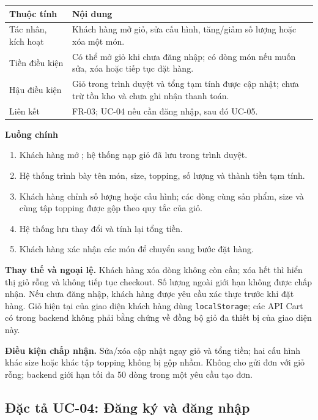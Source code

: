 \begin{longtable}{|p{3.1cm}|p{11.5cm}|}
\hline \textbf{Thuộc tính} & \textbf{Nội dung} \\ \hline
Tác nhân, kích hoạt & Khách hàng mở giỏ, sửa cấu hình, tăng/giảm số lượng
hoặc xóa một món. \\ \hline
Tiền điều kiện & Có thể mở giỏ khi chưa đăng nhập; có dòng món nếu muốn
sửa, xóa hoặc tiếp tục đặt hàng. \\ \hline
Hậu điều kiện & Giỏ trong trình duyệt và tổng tạm tính được cập nhật;
chưa trừ tồn kho và chưa ghi nhận thanh toán. \\ \hline
Liên kết & FR-03; UC-04 nếu cần đăng nhập, sau đó UC-05. \\ \hline
\end{longtable}

\textbf{Luồng chính}
\begin{enumerate}[nosep]
  \item Khách hàng mở ; hệ thống nạp giỏ đã lưu trong trình duyệt.
  \item Hệ thống trình bày tên món, size, topping, số lượng và thành tiền tạm tính.
  \item Khách hàng chỉnh số lượng hoặc cấu hình; các dòng cùng sản phẩm,
  size và cùng tập topping được gộp theo quy tắc của giỏ.
  \item Hệ thống lưu thay đổi và tính lại tổng tiền.
  \item Khách hàng xác nhận các món để chuyển sang bước đặt hàng.
\end{enumerate}

\textbf{Thay thế và ngoại lệ.} Khách hàng xóa dòng không còn cần; xóa hết
thì hiển thị giỏ rỗng và không tiếp tục checkout. Số lượng ngoài giới hạn
không được chấp nhận. Nếu chưa đăng nhập, khách hàng được yêu cầu xác
thực trước khi đặt hàng. Giỏ hiện tại của giao diện khách hàng dùng
\texttt{localStorage}; các API Cart có trong backend không phải bằng
chứng về đồng bộ giỏ đa thiết bị của giao diện này.

\textbf{Điều kiện chấp nhận.} Sửa/xóa cập nhật ngay giỏ và tổng tiền; hai
cấu hình khác size hoặc khác tập topping không bị gộp nhầm. Không cho gửi
đơn với giỏ rỗng; backend giới hạn tối đa 50 dòng trong một yêu cầu tạo đơn.

\subsection{Đặc tả UC-04: Đăng ký và đăng nhập}
\label{uc:04}
\label{uc04}

